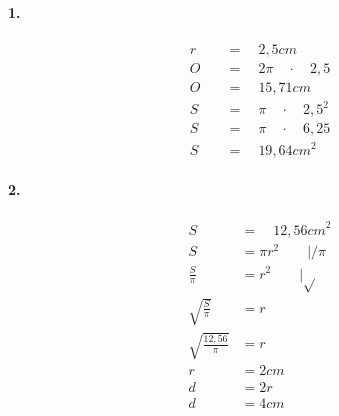 \documentclass[12pt]{article}
\begin{document}
\begin{multicols}{2}
\noindent
\paragraph{1.}
\begin{equation}
\begin{split}
\nonumber
r\quad &=\quad 2,5cm\\ 
O\quad &=\quad 2\pi \quad \cdot \quad 2,5\\
O\quad &=\quad 15,71cm\\ 
S\quad &=\quad \pi \quad \cdot \quad { 2,5 }^{ 2 }\\
S\quad &=\quad \pi \quad \cdot \quad 6,25\\ 
S\quad &=\quad 19,64{ cm }^{ 2 }
\end{split}
\end{equation}
\columnbreak
\paragraph{2.}
\begin{equation}
\begin{split}
\nonumber
S\quad &=\quad { 12,56cm }^{ 2 }\\
S &= \pi { r }^{ 2 }\qquad |/\pi\\
\frac { S }{ \pi  }  &= { r }^{ 2 }\qquad |\sqrt {  }  \\
\sqrt { \frac { S }{ \pi  }  }  &= r \\ 
\sqrt { \frac { 12,56 }{ \pi  }  }  &= r \\
r & = 2cm\\
d & = 2r \\ 
d & = 4cm 
\end{split}
\end{equation}
\end{multicols}
\end{document}
